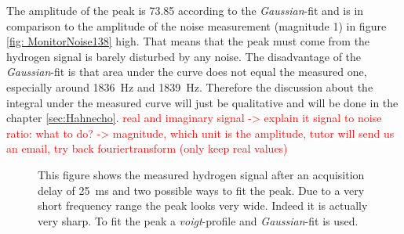 The amplitude of the peak is \SI{73.85}{} according to the \textit{Gaussian}-fit and is in comparison to the amplitude of the noise measurement (magnitude \SI{1}{}) in figure \ref{fig: MonitorNoise138} high. That means that the peak must come from the hydrogen signal is barely disturbed by any noise.\newline
The disadvantage of the \textit{Gaussian}-fit is that area under the curve does not equal the measured one, especially around \SI{1836}{\hertz} and \SI{1839}{\hertz}. Therefore the discussion about the integral under the measured curve will just be qualitative and will be done in the chapter \ref{sec:Hahnecho}.\newline
\textcolor{red}{real and imaginary signal -> explain it}\newline
\textcolor{red}{signal to noise ratio: what to do? -> magnitude, which unit is the amplitude, tutor will send us an email, try back fouriertransform (only keep real values)}
\begin{figure}[H]
    \centering
    
    \caption[This figure shows the measured hydrogen signal after an acquisition delay of \SI{25}{\milli \second} and two possible ways to fit the peak.]{This figure shows the measured hydrogen signal after an acquisition delay of \SI{25}{\milli \second} and two possible ways to fit the peak. Due to a very short frequency range the peak looks very wide. Indeed it is actually very sharp. To fit the peak a \textit{voigt}-profile and \textit{Gaussian}-fit is used.}
    \label{fig:Pulsandcollect138_delay_25_gauss}
\end{figure}